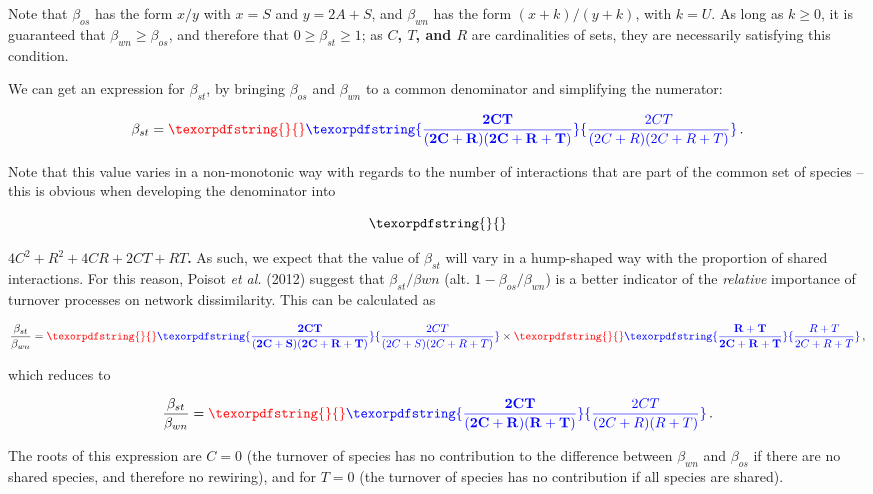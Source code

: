 \documentclass[11pt]{article}
\makeatletter
\def\maxwidth{\ifdim\Gin@nat@width>\linewidth\linewidth
\else\Gin@nat@width\fi}
\let\Oldincludegraphics\includegraphics
\renewcommand{\includegraphics}[1]{\Oldincludegraphics[width=\maxwidth]{#1}}
\providecommand{\DIFaddtex}[1]{{\bf #1}} %
\providecommand{\DIFdeltex}[1]{} %
\providecommand{\DIFaddbegin}{\protect\color{blue}} %
\providecommand{\DIFaddend}{\protect\color{black}} %
\providecommand{\DIFdelbegin}{\protect\color{red}} %
\providecommand{\DIFdelend}{\protect\color{black}} %
\providecommand{\DIFadd}[1]{\texorpdfstring{\DIFaddtex{#1}}{#1}} %
\providecommand{\DIFdel}[1]{\texorpdfstring{\DIFdeltex{#1}}{}} %
\newcommand{\DIFscaledelfig}{0.5}
\newlength{\DIFdelgraphicswidth} %
\newlength{\DIFdelgraphicsheight} %
\newcommand{\DIFaddincludegraphics}[2][]{{\color{blue}\fbox{\DIFOincludegraphics[#1]{#2}}}} %
\newcommand{\DIFdelincludegraphics}[2][]{%
\sbox{\DIFdelgraphicsbox}{\DIFOincludegraphics[#1]{#2}}%
\settoboxwidth{\DIFdelgraphicswidth}{\DIFdelgraphicsbox} %
\settoboxtotalheight{\DIFdelgraphicsheight}{\DIFdelgraphicsbox} %
\scalebox{\DIFscaledelfig}{%
\parbox[b]{\DIFdelgraphicswidth}{\usebox{\DIFdelgraphicsbox}\\[-\baselineskip] \rule{\DIFdelgraphicswidth}{0em}}\llap{\resizebox{\DIFdelgraphicswidth}{\DIFdelgraphicsheight}{%
\setlength{\unitlength}{\DIFdelgraphicswidth}%
\begin{picture}(1,1)%
\thicklines\linethickness{2pt} %
{\color[rgb]{1,0,0}\put(0,0){\framebox(1,1){}}}%
{\color[rgb]{1,0,0}\put(0,0){\line( 1,1){1}}}%
{\color[rgb]{1,0,0}\put(0,1){\line(1,-1){1}}}%
\end{picture}%
}\hspace*{3pt}}} %
} %
\DeclareRobustCommand{\DIFaddbegin}{\DIFOaddbegin \let\includegraphics\DIFaddincludegraphics} %
\DeclareRobustCommand{\DIFaddend}{\DIFOaddend \let\includegraphics\DIFOincludegraphics} %
\DeclareRobustCommand{\DIFdelbegin}{\DIFOdelbegin \let\includegraphics\DIFdelincludegraphics} %
\DeclareRobustCommand{\DIFdelend}{\DIFOaddend \let\includegraphics\DIFOincludegraphics} %
\makeatother
\begin{document}
Note that \(\beta_{os}\) has the form \(x/y\) with \(x = S\) and
\(y = 2A+S\), and \(\beta_{wn}\) has the form \((x+k)/(y+k)\), with
\(k = U\). As long as \(k \ge 0\), it is guaranteed that
\(\beta_{wn} \ge \beta_{os}\), and therefore that
\(0 \ge \beta_{st} \ge 1\); as \DIFdelbegin \DIFdel{\(A\), \(S\), and \(U\) }\DIFdelend \DIFaddbegin \DIFadd{\(C\), \(T\), and \(R\) }\DIFaddend are cardinalities
of sets, they are necessarily satisfying this condition.

We can get an expression for \(\beta_{st}\), by bringing \(\beta_{os}\)
and \(\beta_{wn}\) to a common denominator and simplifying the
numerator:

\[\beta_{st} = \DIFdelbegin \DIFdel{\frac{2AU}{(2A+S)(2A+S+U)}}\DIFdelend \DIFaddbegin \DIFadd{\frac{2CT}{(2C+R)(2C+R+T)}}\DIFaddend \,.\]

Note that this value varies in a non-monotonic way with regards to the
number of interactions that are part of the common set of species --
this is obvious when developing the denominator into
\DIFdelbegin %

\[\DIFdel{4A^2 + S^2 + 4AS + 2AU + SU\,,}\]%

\DIFdelend \DIFaddbegin \DIFadd{\(4C^2 + R^2 + 4CR + 2CT + RT\). }\DIFaddend As such, we expect that the value of
\(\beta_{st}\) will vary in a hump-shaped way with the proportion of
shared interactions. For this reason, Poisot \emph{et al.} (2012)
suggest that \(\beta_{st}/\beta{wn}\) (alt. \(1-\beta_{os}/\beta_{wn}\))
is a better indicator of the \emph{relative} importance of turnover
processes on network dissimilarity. This can be calculated as

\[\frac{\beta_{st}}{\beta_{wn}} = \DIFdelbegin \DIFdel{\frac{2AU}{(2A+S)(2A+S+U)}}\DIFdelend \DIFaddbegin \DIFadd{\frac{2CT}{(2C+S)(2C+R+T)}}\DIFaddend \times\DIFdelbegin \DIFdel{\frac{S+U}{2A+S+U}}\DIFdelend \DIFaddbegin \DIFadd{\frac{R+T}{2C+R+T}}\DIFaddend \,,\]

which reduces to

\[\frac{\beta_{st}}{\beta_{wn}} = \DIFdelbegin \DIFdel{\frac{2AU}{(2A+S)(S+U)}}\DIFdelend \DIFaddbegin \DIFadd{\frac{2CT}{(2C+R)(R+T)}}\DIFaddend \,.\]

The roots of this expression are \DIFdelbegin \DIFdel{\(A=0\) }\DIFdelend \DIFaddbegin \DIFadd{\(C=0\) }\DIFaddend (the turnover of species has no
contribution to the difference between \(\beta_{wn}\) and \(\beta_{os}\)
if there are no shared species, and therefore no rewiring), and for
\DIFdelbegin \DIFdel{\(U = 0\) }\DIFdelend \DIFaddbegin \DIFadd{\(T = 0\) }\DIFaddend (the turnover of species has no contribution if all species
are shared).
\end{document}
